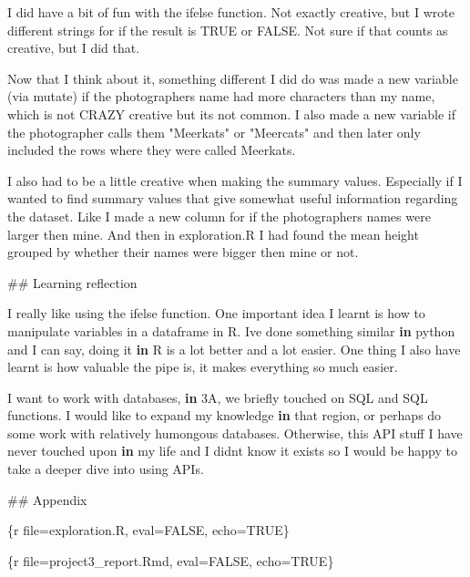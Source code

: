 \documentclass[
]{article}
\newenvironment{Shaded}{\begin{snugshade}}{\end{snugshade}}
\newcommand{\ControlFlowTok}[1]{\textcolor[rgb]{0.13,0.29,0.53}{\textbf{#1}}}
\newcommand{\DecValTok}[1]{\textcolor[rgb]{0.00,0.00,0.81}{#1}}
\newcommand{\NormalTok}[1]{#1}
\newcommand{\StringTok}[1]{\textcolor[rgb]{0.31,0.60,0.02}{#1}}
\begin{document}
\begin{Shaded}
\begin{Highlighting}[]
\StringTok{I did have a bit of fun with the ifelse function. Not exactly creative, but I wrote different strings for if the result is TRUE or FALSE. Not sure if that counts as creative, but I did that.}

\StringTok{Now that I think about it, something different I did do was made a new variable (via mutate) if the photographers name had more characters than my name, which is not CRAZY creative but its not common. I also made a new variable if the photographer calls them "Meerkats" or "Meercats" and then later only included the rows where they were called Meerkats.}

\StringTok{I also had to be a little creative when making the summary values. Especially if I wanted to find summary values that give somewhat useful information regarding the dataset. Like I made a new column for if the photographers names were larger then mine. And then in exploration.R I had found the mean height grouped by whether their names were bigger then mine or not. }


\StringTok{\#\# Learning reflection}

\StringTok{I really like using the ifelse function. One important idea I learnt is how to manipulate variables in a dataframe in R. I\textquotesingle{}}\NormalTok{ve done something similar }\ControlFlowTok{in}\NormalTok{ python and I can say, doing it }\ControlFlowTok{in}\NormalTok{ R is a lot better and a lot easier. One thing I also have learnt is how valuable the pipe is, it makes everything so much easier.}

\NormalTok{I want to work with databases, }\ControlFlowTok{in} \DecValTok{3}\NormalTok{A, we briefly touched on SQL and SQL functions. I would like to expand my knowledge }\ControlFlowTok{in}\NormalTok{ that region, or perhaps do some work with relatively humongous databases. Otherwise, this API stuff I have never touched upon }\ControlFlowTok{in}\NormalTok{ my life and I didn}\StringTok{\textquotesingle{}t know it exists so I would be happy to take a deeper dive into using APIs.}

\StringTok{\#\# Appendix}

\StringTok{\textasciigrave{}\textasciigrave{}\textasciigrave{}\{r file=\textquotesingle{}}\NormalTok{exploration.R}\StringTok{\textquotesingle{}, eval=FALSE, echo=TRUE\}}

\StringTok{\textasciigrave{}\textasciigrave{}\textasciigrave{}}
\StringTok{\textasciigrave{}\textasciigrave{}\textasciigrave{}\{r file=\textquotesingle{}}\NormalTok{project3\_report.Rmd}\StringTok{\textquotesingle{}, eval=FALSE, echo=TRUE\}}

\StringTok{\textasciigrave{}\textasciigrave{}\textasciigrave{}}
\end{Highlighting}
\end{Shaded}
\end{document}
